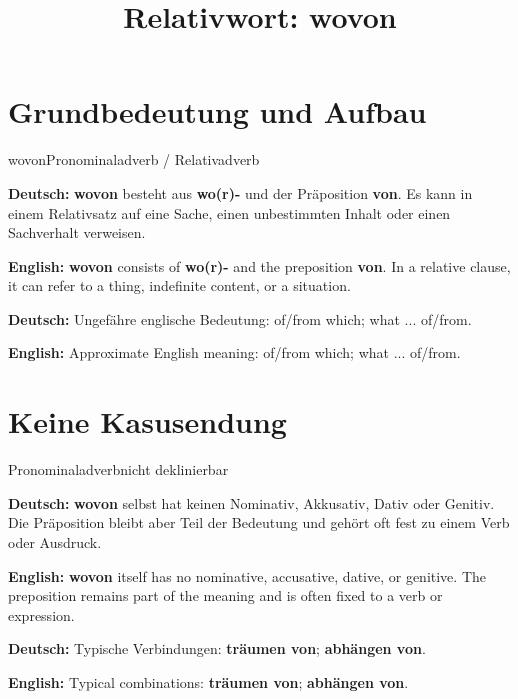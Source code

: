 \documentclass[a4paper,11pt]{article}
\title{Relativwort: \glqq wovon\grqq{}}
\date{}
\newcommand{\GermanText}[1]{\textbf{Deutsch: }#1\par}
\newcommand{\EnglishText}[1]{{\small\color{SoftGray}\textbf{English: }#1\par}}
\begin{document}
\maketitle

\tableofcontents

\newpage

\section{Grundbedeutung und Aufbau}

\begin{grammarentry}{wovon}{Pronominaladverb / Relativadverb}

\GermanText{\textbf{wovon} besteht aus \textbf{wo(r)-} und der Präposition \textbf{von}. Es kann in einem Relativsatz auf eine Sache, einen unbestimmten Inhalt oder einen Sachverhalt verweisen.}

\EnglishText{\textbf{wovon} consists of \textbf{wo(r)-} and the preposition \textbf{von}. In a relative clause, it can refer to a thing, indefinite content, or a situation.}

\GermanText{Ungefähre englische Bedeutung: \glqq of/from which; what ... of/from\grqq{}.}

\EnglishText{Approximate English meaning: \glqq of/from which; what ... of/from\grqq{}.}

\end{grammarentry}

\section{Keine Kasusendung}

\begin{grammarentry}{Pronominaladverb}{nicht deklinierbar}

\GermanText{\textbf{wovon} selbst hat keinen Nominativ, Akkusativ, Dativ oder Genitiv. Die Präposition bleibt aber Teil der Bedeutung und gehört oft fest zu einem Verb oder Ausdruck.}

\EnglishText{\textbf{wovon} itself has no nominative, accusative, dative, or genitive. The preposition remains part of the meaning and is often fixed to a verb or expression.}

\GermanText{Typische Verbindungen: \textbf{träumen von}; \textbf{abhängen von}.}

\EnglishText{Typical combinations: \textbf{träumen von}; \textbf{abhängen von}.}

\end{grammarentry}
\end{document}
